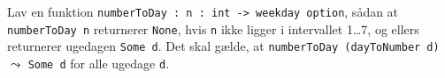Lav en funktion \lstinline{numberToDay : n : int -> weekday option},
sådan at \lstinline{numberToDay n} returnerer \lstinline{None}, hvis
\lstinline!n! ikke ligger i intervallet 1\ldots7, og ellers returnerer
ugedagen \lstinline{Some d}. Det skal gælde, at %
\lstinline{numberToDay (dayToNumber d)} $\leadsto$ \lstinline!Some d!
for alle ugedage \lstinline!d!.